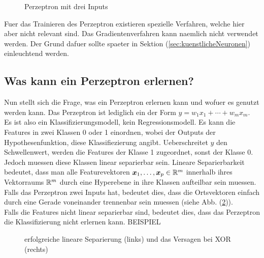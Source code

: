 \para{}
\begin{figure}[h!]
  \centering
  \caption{Perzeptron mit drei Inputs}
  \label{fi:perzeptron}
\end{figure}
\para{}
Fuer das Trainieren des Perzeptron existieren spezielle Verfahren, welche hier
aber nicht relevant sind. Das Gradientenverfahren kann naemlich nicht verwendet
werden. Der Grund dafuer sollte spaeter in Sektion (\ref{sec:kuenstlicheNeuronen}) einleuchtend werden.

\subsection{Was kann ein Perzeptron erlernen?}
Nun stellt sich die Frage, was ein Perzeptron erlernen kann und wofuer es genutzt werden kann.
Das Perzeptron ist lediglich ein  der Form
$y = w_1x_1 + \cdots + w_m x_m$. Es ist also ein Klassifizierungsmodell, kein Regressionsmodell.
Es kann die Features in zwei Klassen 0 oder 1 einordnen, wobei der Outputs der
Hypothesenfunktion, diese Klassifiezierung angibt.
Ueberschreitet $y$ den Schwellenwert, werden die Features der Klasse 1 zugeordnet, sonst
der Klasse 0.
Jedoch muessen diese Klassen linear separierbar sein.
\para{}
Lineare Separierbarkeit bedeutet, dass man alle Featurevektoren $\bm{x}_1,\ldots,\bm{x}_p \in \mathbb{R}^m$
innerhalb ihres Vektorraums $\mathbb{R}^m$ durch eine Hyperebene in ihre Klassen aufteilbar sein muessen.
Falls das Perzeptron zwei Inputs hat, bedeutet dies, dass die Ortsvektoren
einfach durch eine Gerade voneinander trennenbar sein muessen (siehe Abb.
(\ref{fig:linearer_Klassifikator})). \\
Falls die Features nicht linear separierbar sind, bedeutet dies, dass das
Perzeptron die Klassifizierung nicht erlernen kann.
BEISPIEL
\\
\begin{figure}[h!]
  \caption{erfolgreiche lineare Separierung (links) und das Versagen bei XOR (rechts)}
  \label{fig:linearer_Klassifikator}
\end{figure}
\para{}
\cite{wiki:perzeptron}
\cite{wiki:linear_separability}

